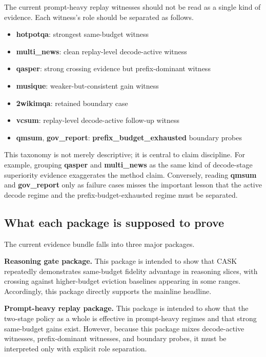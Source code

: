 The current prompt-heavy replay witnesses should not be read as a single kind of evidence. Each witness's role should be separated as follows.


\begin{itemize}
\item \textbf{hotpotqa}: strongest same-budget witness
\item \textbf{multi\_news}: clean replay-level decode-active witness
\item \textbf{qasper}: strong crossing evidence but prefix-dominant witness
\item \textbf{musique}: weaker-but-consistent gain witness
\item \textbf{2wikimqa}: retained boundary case
\item \textbf{vcsum}: replay-level decode-active follow-up witness
\item \textbf{qmsum}, \textbf{gov\_report}: \textbf{prefix\_budget\_exhausted} boundary probes
\end{itemize}


This taxonomy is not merely descriptive; it is central to claim discipline. For example, grouping \textbf{qasper} and \textbf{multi\_news} as the same kind of decode-stage superiority evidence exaggerates the method claim. Conversely, reading \textbf{qmsum} and \textbf{gov\_report} only as failure cases misses the important lesson that the active decode regime and the prefix-budget-exhausted regime must be separated.


\subsection{What each package is supposed to prove}


The current evidence bundle falls into three major packages.


\textbf{Reasoning gate package.} This package is intended to show that CASK repeatedly demonstrates same-budget fidelity advantage in reasoning slices, with crossing against higher-budget eviction baselines appearing in some ranges. Accordingly, this package directly supports the mainline headline.


\textbf{Prompt-heavy replay package.} This package is intended to show that the two-stage policy as a whole is effective in prompt-heavy regimes and that strong same-budget gains exist. However, because this package mixes decode-active witnesses, prefix-dominant witnesses, and boundary probes, it must be interpreted only with explicit role separation.


